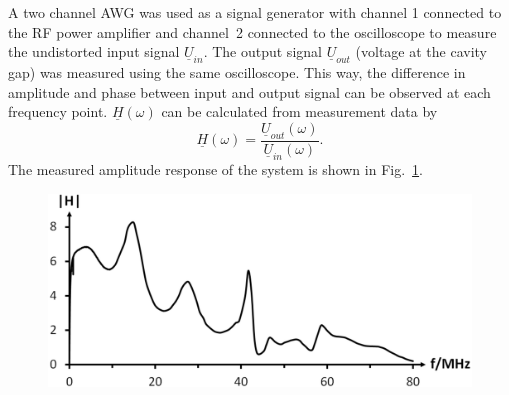 \documentclass[a4paper,
               keeplastbox,%
               nospread%
              ]{jacow}
\begin{document}
	A two channel AWG was used as a signal generator with channel 1	connected to the RF power amplifier and channel~2 connected to the oscilloscope to measure 
	the undistorted input signal $\underline{U}_{in}$. The output signal $\underline{U}_{out}$ (voltage at the cavity gap) was measured using the 
	same oscilloscope. This way, the difference in amplitude and phase between input and output signal can be observed at each frequency point. 
	$\underline{H}(\omega)$ can be calculated from measurement data
	by
	\begin{equation}
	 \underline{H}(\omega)=\frac{\underline{U}_{out}(\omega)}{\underline{U}_{in}(\omega)}.
	\end{equation}
	The measured amplitude response of the system is shown in Fig.~\ref{H_ESR}.
	
	\begin{figure}[b]
	 \begin{center}
	  \includegraphics[scale=0.27]{WEPVA047f3.eps}
	  \label{H_ESR}
	  \vspace*{-\baselineskip}
	 \end{center}
	\end{figure}	
\end{document}
